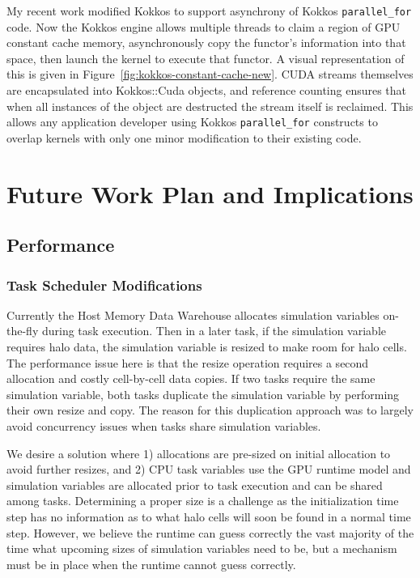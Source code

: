 \documentclass[12pt]{article}
\begin{document}
My recent work modified Kokkos to support asynchrony of Kokkos \texttt{parallel\_for} code.  Now the Kokkos engine allows multiple threads to claim a region of GPU constant cache memory, asynchronously copy the functor's information into that space, then launch the kernel to execute that functor.  A visual representation of this is given in Figure~\ref{fig:kokkos-constant-cache-new}.  CUDA streams themselves are encapsulated into Kokkos::Cuda objects, and reference counting ensures that when all instances of the object are destructed the stream itself is reclaimed.  This allows any application developer using Kokkos \texttt{parallel\_for} constructs to overlap kernels with only one minor modification to their existing code. 




\section{Future Work Plan and Implications}
\label{ch:workplan}

\subsection{Performance}
\label{ch:workplan-performance}
\subsubsection{Task Scheduler Modifications}
\label{ch:task-scheduler-modification}
Currently the Host Memory Data Warehouse allocates simulation variables on-the-fly during task execution.  Then in a later task, if the simulation variable requires halo data, the simulation variable is resized to make room for halo cells.  The performance issue here is that the resize operation requires a second allocation and costly cell-by-cell data copies.  If two tasks require the same simulation variable, both tasks duplicate the simulation variable by performing their own resize and copy.  The reason for this duplication approach was to largely avoid concurrency issues when tasks share simulation variables.    

We desire a solution where 1) allocations are pre-sized on initial allocation to avoid further resizes, and 2) CPU task variables use the GPU runtime model and simulation variables are allocated prior to task execution and can be shared among tasks.  Determining a proper size is a challenge as the initialization time step has no information as to what halo cells will soon be found in a normal time step.  However, we believe the runtime can guess correctly the vast majority of the time what upcoming sizes of simulation variables need to be, but a mechanism must be in place when the runtime cannot guess correctly.  
\end{document}
